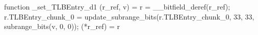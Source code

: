 function _set_TLBEntry_d1 (r_ref, v) = {
    r = __bitfield_deref(r_ref);
    r.TLBEntry_chunk_0 = update_subrange_bits(r.TLBEntry_chunk_0, 33, 33, subrange_bits(v, 0, 0));
    (*r_ref) = r
}
